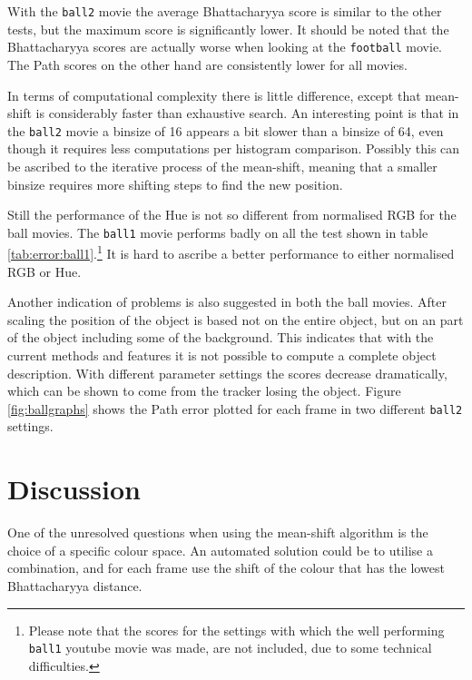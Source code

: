 \documentclass[a4paper,11pt]{article}
\begin{document}
With the \texttt{ball2} movie the average Bhattacharyya score is similar to the other tests, but the maximum score is significantly lower.
It should be noted that the Bhattacharyya scores are actually worse when looking at the \texttt{football} movie.
The Path scores on the other hand are consistently lower for all movies.

In terms of computational complexity there is little difference, except that mean-shift is considerably faster than exhaustive search.
An interesting point is that in the \texttt{ball2} movie a binsize of 16 appears a bit slower than a binsize of 64, even though it requires less computations per histogram comparison.
Possibly this can be ascribed to the iterative process of the mean-shift, meaning that a smaller binsize requires more shifting steps to find the new position.

Still the performance of the Hue is not so different from normalised RGB for the ball movies.
The \texttt{ball1} movie performs badly on all the test shown in table \ref{tab:error:ball1}.\footnote{Please note that the scores for the settings with which the well performing \texttt{ball1} youtube movie was made, are not included, due to some technical difficulties.}
It is hard to ascribe a better performance to either normalised RGB or Hue.

Another indication of problems is also suggested in both the ball movies.
After scaling the position of the object is based not on the entire object, but on an part of the object including some of the background.
This indicates that with the current methods and features it is not possible to compute a complete object description.
With different parameter settings the scores decrease dramatically, which can be shown to come from the tracker losing the object.
Figure \ref{fig:ballgraphs} shows the Path error plotted for each frame in two different \texttt{ball2} settings.


\section{Discussion}
\label{sec:discussion}
One of the unresolved questions when using the mean-shift algorithm is the choice of a specific colour space.
An automated solution could be to utilise a combination, and for each frame use the shift of the colour that has the lowest Bhattacharyya distance.
\end{document}
